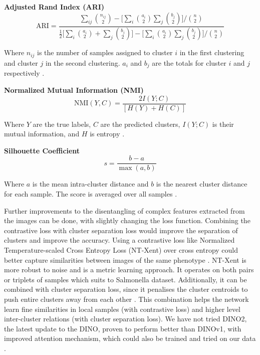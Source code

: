 \documentclass[12pt,a4paper]{article}
\begin{document}
\textbf{Adjusted Rand Index (ARI)}
\begin{equation}
\text{ARI} = \frac{\sum_{ij} \binom{n_{ij}}{2} - \biggl[ \sum_i \binom{a_i}{2}  \sum_j \binom{b_j}{2} \biggr] / \binom{n}{2}} {\frac{1}{2} \biggl[ \sum_i \binom{a_i}{2} + \sum_j \binom{b_j}{2} \biggr] - \biggl[ \sum_i \binom{a_i}{2}  \sum_j \binom{b_j}{2} \biggr] / \binom{n}{2}}
\end{equation}


Where $n_{ij}$ is the number of samples assigned to cluster $i$ in the first clustering and cluster $j$ in the second clustering. $a_i$ and $b_j$ are the totals for cluster $i$ and $j$ respectively \cite{ARI}.

\textbf{Normalized Mutual Information (NMI)}
\begin{equation}
\text{NMI}(Y, C) = \frac{2 I(Y;C)}{[H(Y) + H(C)]}
\end{equation}

Where $Y$ are the true labels, $C$ are the predicted clusters, $I(Y;C)$ is their mutual information, and $H$ is entropy \cite{NMI}.

\textbf{Silhouette Coefficient}
\begin{equation}
s = \frac{b-a}{\max(a,b)}
\end{equation}

Where $a$ is the mean intra-cluster distance and $b$ is the nearest cluster distance for each sample. The score is averaged over all samples \cite{silhouettecoefficient}.


Further improvements to the disentangling of complex features extracted from the images can be done, with slightly changing the loss function. Combining the contrastive loss with cluster separation loss would improve the separation of clusters and improve the accuracy. Using a contrastive loss like Normalized Temperature-scaled Cross Entropy Loss (NT-Xent) over cross entropy could better capture similarities between images of the same phenotype \cite{koch2015siamese}. NT-Xent is more robust to noise and is a metric learning approach. It operates on both pairs or triplets of samples which suits to Salmonella dataset. Additionally, it can be combined with cluster separation loss, since it penalises the cluster centroids to push entire clusters away from each other \cite{xu2018variational}. This combination helps the network learn fine similarities in local samples (with contrastive loss) and higher level inter-cluster relations (with cluster separation loss). We have not tried DINO2, the latest update to the DINO, proven to perform better than DINOv1, with improved attention mechanism, which could also be trained and tried on our data \cite{chen2023dinov2}.
\end{document}
